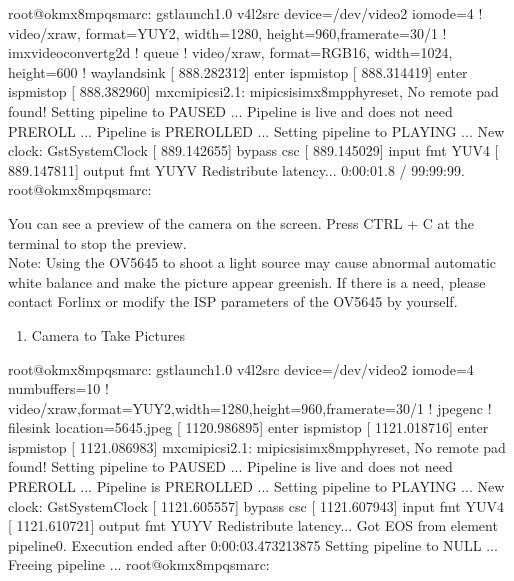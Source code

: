 \documentclass[letterpaper,10pt,openany,english]{sphinxmanual}
\begin{document}
\begin{sphinxVerbatim}[commandchars=\\\{\}]
root@ok\PYGZhy{}mx8mpq\PYGZhy{}smarc:\PYGZti{}\PYGZsh{} gst\PYGZhy{}launch\PYGZhy{}1.0 v4l2src device=/dev/video2 io\PYGZhy{}mode=4 ! video/x\PYGZhy{}raw, format=YUY2, width=1280, height=960,framerate=30/1 ! imxvideoconvert\PYGZus{}g2d ! queue ! video/x\PYGZhy{}raw, format=RGB16, width=1024, height=600 ! waylandsink
[  888.282312] enter isp\PYGZus{}mi\PYGZus{}stop
[  888.314419] enter isp\PYGZus{}mi\PYGZus{}stop
[  888.382960] mxc\PYGZhy{}mipi\PYGZhy{}csi2.1: mipi\PYGZus{}csis\PYGZus{}imx8mp\PYGZus{}phy\PYGZus{}reset, No remote pad found!
Setting pipeline to PAUSED ...
Pipeline is live and does not need PREROLL ...
Pipeline is PREROLLED ...
Setting pipeline to PLAYING ...
New clock: GstSystemClock
[  889.142655] bypass csc
[  889.145029] input fmt YUV4
[  889.147811] output fmt YUYV
Redistribute latency...
0:00:01.8 / 99:99:99.
root@ok\PYGZhy{}mx8mpq\PYGZhy{}smarc:\PYGZti{}\PYGZsh{}
\end{sphinxVerbatim}

\sphinxAtStartPar
You can see a preview of the camera on the screen. Press CTRL + C at the terminal to stop the preview.\\
Note: Using the OV5645 to shoot a light source may cause abnormal automatic white balance and make the picture appear greenish. If there is a need, please contact Forlinx or modify the ISP parameters of the OV5645 by yourself.
\begin{enumerate}
%
\setcounter{enumi}{1}
\item {} 
\sphinxAtStartPar
Camera to Take Pictures

\end{enumerate}

\begin{sphinxVerbatim}[commandchars=\\\{\}]
root@ok\PYGZhy{}mx8mpq\PYGZhy{}smarc:\PYGZti{}\PYGZsh{} gst\PYGZhy{}launch\PYGZhy{}1.0 v4l2src device=/dev/video2 io\PYGZhy{}mode=4 num\PYGZhy{}buffers=10 ! video/x\PYGZhy{}raw,format=YUY2,width=1280,height=960,framerate=30/1 ! jpegenc ! filesink location=5645.jpeg
[ 1120.986895] enter isp\PYGZus{}mi\PYGZus{}stop
[ 1121.018716] enter isp\PYGZus{}mi\PYGZus{}stop
[ 1121.086983] mxc\PYGZhy{}mipi\PYGZhy{}csi2.1: mipi\PYGZus{}csis\PYGZus{}imx8mp\PYGZus{}phy\PYGZus{}reset, No remote pad found!
Setting pipeline to PAUSED ...
Pipeline is live and does not need PREROLL ...
Pipeline is PREROLLED ...
Setting pipeline to PLAYING ...
New clock: GstSystemClock
[ 1121.605557] bypass csc
[ 1121.607943] input fmt YUV4
[ 1121.610721] output fmt YUYV
Redistribute latency...
Got EOS from element \PYGZdq{}pipeline0\PYGZdq{}.
Execution ended after 0:00:03.473213875
Setting pipeline to NULL ...
Freeing pipeline ...
root@ok\PYGZhy{}mx8mpq\PYGZhy{}smarc:\PYGZti{}\PYGZsh{}
\end{sphinxVerbatim}
\end{document}
